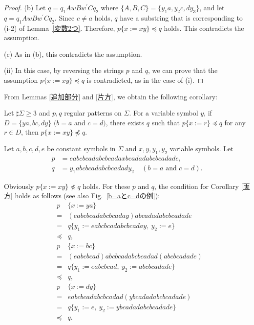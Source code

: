 \begin{proof}
\textrm{(b)}
Let $q=q_{1}AwBw^{\prime}Cq_{2}$ where $\{ A,B,C \} = \{ y_{1}a,y_{2}c,dy_{3} \}$, and let $q=q_{1}AwBw^{\prime}Cq_{2}$.
Since $c \not = a$ holds, $q$ have a substring that is corresponding to (i-2) of Lemma~\ref{変数2つ}.
Therefore, $p \{ x:= xy \} \preceq q$ holds.
This contradicts the assumption. 

\textrm{(c)} As in (b), this contradicts the assumption.

\noindent\textrm{(ii)}
In this case, by reversing the strings $p$ and $q$, we can prove that the assumption $p \{ x := xy \} \preceq q$ is contradicted, as in the case of \textrm{(i)}.
\end{proof}

From Lemmas \ref{追加部分} and \ref{片方}, we obtain the following corollary:

\begin{col}\label{両方}
  Let $\sharp \Sigma \ge 3$ and $p, q$ regular patterns on $\Sigma$.
  For a variable symbol $y$, if $D= \{ ya, bc, dy \}$ $(b = a$ and $c = d)$, there exists $q$ such that $p \{ x := r \} \preceq q$ for any $r \in D$, then $p \{ x := xy \} \not \preceq q$.
\end{col}
\begin{ex}
Let $a,b,c,d,e$ be constant symbols in $\Sigma$ and 
$x,y,y_{1},y_{2}$ variable symbols.
Let 
\begin{align*}
p &= eabcbcadabcbcadaxbcadadabcbcadade,\\
q &= y_{1}abcbcadabcbcadady_{2}~~~~~(b = a\mbox{~and~}c = d).
\end{align*}

\noindent
Obviously $p \{ x:=xy \} \not \preceq q$ holds.
For these $p$ and $q$, the condition for Corollary \ref{両方} holds as follows (see also Fig.~\ref{b=aとc=dの例}):
\begin{eqnarray*}
&p& \{ x:=ya \} \\ 
& = & (eabcbcadabcbcaday)abcadadabcbcadade\\
& = & q \{ y_{1} := eabcbcadabcbcaday,~y_{2}:=e \} \\
& \preceq & q,\\
&p& \{ x:=bc \}  \\
& = & (eabcbcad)abcbcadabcbcadad(abcbcadade) \\
& = & q \{ y_{1} := eabcbcad,~y_{2} := abcbcadade \} \\
& \preceq & q,\\
&p& \{ x:=dy \}  \\
& = & eabcbcadabcbcadad(ybcadadabcbcadade) \\
& = & q \{ y_{1}:=e,~y_{2} := ybcadadabcbcadade \} \\
& \preceq & q.
\end{eqnarray*}
\end{ex}


